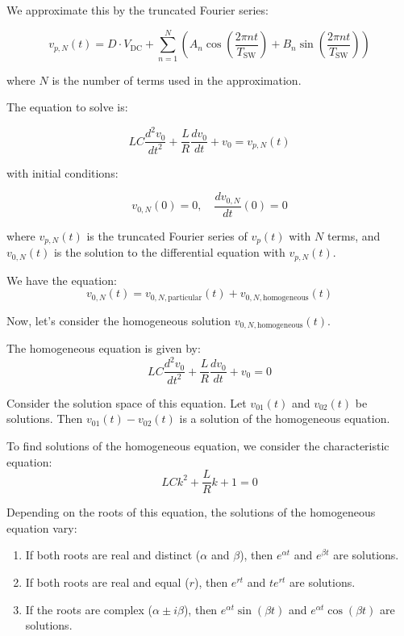 \documentclass{article}
\begin{document}
We approximate this by the truncated Fourier series:

\[
v_{p,N}(t) = D \cdot V_{\text{DC}} + \sum_{n=1}^{N} \left( A_n \cos\left(\frac{2\pi n t}{T_{\text{SW}}}\right) + B_n \sin\left(\frac{2\pi n t}{T_{\text{SW}}}\right) \right)
\]

where \( N \) is the number of terms used in the approximation.

The equation to solve is:

\[
LC \frac{d^2 v_0}{dt^2} + \frac{L}{R} \frac{dv_0}{dt} + v_0 = v_{p,N}(t)
\]

with initial conditions:

\[
v_{0,N}(0) = 0, \quad \frac{dv_{0,N}}{dt}(0) = 0
\]

where \( v_{p,N}(t) \) is the truncated Fourier series of \( v_p(t) \) with \( N \) terms,
and \( v_{0,N}(t) \) is the solution to the differential equation with \( v_{p,N}(t) \).

We have the equation:
\begin{equation}
v_{0,N}(t) = v_{0,N,\text{particular}}(t) + v_{0,N,\text{homogeneous}}(t)
\end{equation}

Now, let's consider the homogeneous solution \(v_{0,N,\text{homogeneous}}(t)\). 

The homogeneous equation is given by:
\[
LC \frac{d^2 v_0}{dt^2} + \frac{L}{R} \frac{dv_0}{dt} + v_0 = 0
\]

Consider the solution space of this equation. Let \(v_{01}(t)\) and \(v_{02}(t)\) be solutions. Then \(v_{01}(t) - v_{02}(t)\) is a solution of the homogeneous equation.

To find solutions of the homogeneous equation, we consider the characteristic equation:
\[
LC k^2 + \frac{L}{R} k + 1 = 0
\]

Depending on the roots of this equation, the solutions of the homogeneous equation vary:
\begin{enumerate}
    \item If both roots are real and distinct (\( \alpha \) and \( \beta \)), then \( e^{\alpha t} \) and \( e^{\beta t} \) are solutions.
    \item If both roots are real and equal (\( r \)), then \( e^{rt} \) and \( t e^{rt} \) are solutions.
    \item If the roots are complex (\( \alpha \pm i \beta \)), then \( e^{\alpha t} \sin(\beta t) \) and \( e^{\alpha t} \cos(\beta t) \) are solutions.
\end{enumerate}
\end{document}
